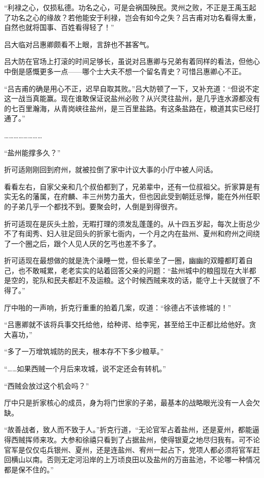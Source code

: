“利禄之心，仅损私德。功名之心，可是会祸国殃民。灵州之败，不正是王禹玉起了功名之心的缘故？若他能安于利禄，岂会有如今之失？吕吉甫对功名看得太重，自然也就将国事、百姓看得轻了！”

吕大临对吕惠卿颇看不上眼，言辞也不甚客气。

吕大防在官场上打滚的时间足够长，虽说对吕惠卿与兄弟有着同样的看法，但他心中倒是感慨更多一点——哪个士大夫不想一个留名青史？可惜吕惠卿心不正。

“吕吉甫的确是用心不正，迟早自取其败。”吕大防顿了一下，又补充道：“但说不定这一战当真能赢。现在谁敢保证说盐州必败？从兴灵往盐州，是几乎连水源都没有的七百里瀚海，从青岗峡往盐州，是三百里盐路。有这条盐路在，粮道其实已经打通了。”

……………………

“盐州能撑多久？”

折可适刚刚回到府州，就被拉倒了家中计议大事的小厅中被人问话。

看看左右，自家父亲和几个叔伯都到了，兄弟辈中，还有一位叔祖父。折家算是有实无名的藩属，在府麟、丰三州势力虽大，但也因此受到朝廷忌惮，能在外州任职的子弟几乎一个都找不到。要聚会时，人倒是到得很齐。

折可适现在是灰头土脸，无暇打理的须发乱蓬蓬的。从十四五岁起，每次上街总少不了有闺秀、妇人驻足回头的折家七衙内，一个月之内在盐州、夏州和府州之间绕了一个圈之后，跟个人见人厌的乞丐也差不多了。

折可适现在最想做的就是洗个澡睡一觉，但长辈坐了一圈，幽幽的双瞳都盯着自己，也不敢喊累，老老实实的站着回答父亲的问题：“盐州城中的粮囤现在大半都是空的，驼队和民夫都赶不及运粮。这个时候西贼来攻的话，能守上十天就很了不得了。”

厅中啪的一声响，折克行重重的拍着几案，叹道：“徐德占不该修城的！”

“吕惠卿就不该将兵事交托给他，给种谔、给李宪，甚至给王中正都比给他好。贪大喜功，”

“多了一万增筑城防的民夫，根本存不下多少粮草。”

“……如果西贼一个月后来攻城，说不定还会有转机。”

“西贼会放过这个机会吗？”

厅中只是折家核心的成员，身为将门世家的子弟，最基本的战略眼光没有一人会欠缺。

“故善战者，致人而不致于人。”折克行道，“无论官军占着盐州，还是夏州，都能逼得西贼挥师来攻。大参和徐禧只看到了占据盐州，使得银夏之地尽归我有。可不论官军是仅仅屯兵银州、夏州，还是连盐州、宥州一起占下，党项人都必须将官军赶回横山以南。否则无定河沿岸的上万顷良田以及盐州的万亩盐池，不论哪一种情况都是保不住的。”

